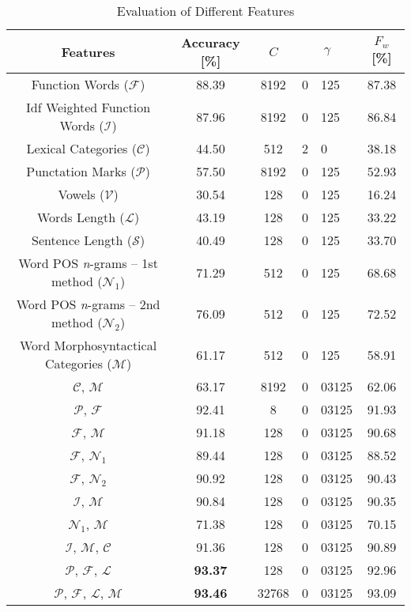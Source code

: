 \documentclass{llncs}
\begin{document}
\begin{table*}[htb]
\begin{center}
\caption{Evaluation of Different Features}%
\begin{tabular}{c c c r@{.}l c}%
\toprule%
Features & Accuracy [\%] & $C$ & \multicolumn{2}{c}{$\gamma$} & $F_w$ [\%]\\
\midrule
Function Words ($\mathcal{F}$) & 88.39 & 8192 & 0 & 125 & 87.38\\
Idf Weighted Function Words ($\mathcal{I}$) & 87.96 & 8192 & 0 & 125 & 86.84\\
Lexical Categories ($\mathcal{C}$) & 44.50 & 512 & 2 & 0 & 38.18\\
Punctation Marks ($\mathcal{P}$) & 57.50 & 8192 & 0 & 125 & 52.93\\
Vowels ($\mathcal{V}$) & 30.54 & 128 & 0 & 125 & 16.24\\
Words Length ($\mathcal{L}$) & 43.19 & 128 & 0 & 125 & 33.22\\
Sentence Length ($\mathcal{S}$) & 40.49 & 128 & 0 & 125 & 33.70\\
Word POS \emph{n}-grams -- 1st method ($\mathcal{N}_1$) & 71.29 &
512 & 0 & 125 & 68.68\\
Word POS \emph{n}-grams -- 2nd method ($\mathcal{N}_2$) & 76.09
& 512 & 0 & 125 & 72.52\\
Word Morphosyntactical Categories ($\mathcal{M}$) & 61.17 & 512 & 0 & 125 & 58.91\\
$\mathcal{C}$, $\mathcal{M}$ & 63.17 & 8192 & 0 & 03125 & 62.06\\
$\mathcal{P}$, $\mathcal{F}$ & 92.41 & 8 & 0 & 03125 & 91.93\\
$\mathcal{F}$, $\mathcal{M}$ & 91.18 & 128 & 0 & 03125 & 90.68\\
$\mathcal{F}$, $\mathcal{N}_1$ & 89.44 & 128 & 0 & 03125 & 88.52\\
$\mathcal{F}$, $\mathcal{N}_2$ & 90.92 & 128 & 0 & 03125 & 90.43\\
$\mathcal{I}$, $\mathcal{M}$ & 90.84 & 128 & 0 & 03125 & 90.35\\
$\mathcal{N}_1$, $\mathcal{M}$ & 71.38 & 128 & 0 & 03125 & 70.15\\
$\mathcal{I}$, $\mathcal{M}$, $\mathcal{C}$ & 91.36 & 128 & 0 & 03125 & 90.89\\
$\mathcal{P}$, $\mathcal{F}$, $\mathcal{L}$ & \textbf{93.37} & 128 & 0 & 03125
& 92.96\\
$\mathcal{P}$, $\mathcal{F}$, $\mathcal{L}$, $\mathcal{M}$ & \textbf{93.46} &
32768 & 0 & 03125 & 93.09\\

\end{tabular}
\end{center}
\end{table*}
\end{document}
